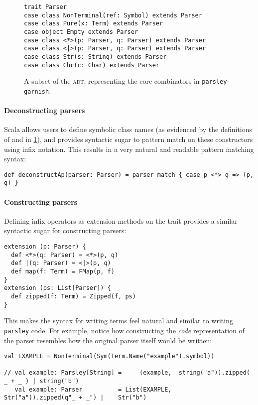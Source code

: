 \documentclass[../../main.tex]{subfiles}
\begin{document}
\begin{figure}[htbp]
\begin{verbatim}
trait Parser
case class NonTerminal(ref: Symbol) extends Parser
case class Pure(x: Term) extends Parser
case object Empty extends Parser
case class <*>(p: Parser, q: Parser) extends Parser
case class <|>(p: Parser, q: Parser) extends Parser
case class Str(s: String) extends Parser
case class Chr(c: Char) extends Parser
\end{verbatim}
\caption{A subset of the  \textsc{adt}, representing the core combinators in \texttt{parsley-garnish}.}
\label{fig:parser-adt}
\end{figure}

\paragraph{Deconstructing parsers}
Scala allows users to define symbolic class names (as evidenced by the definitions of \scala{<*>} and \scala{<|>} in \cref{fig:parser-adt}), and provides syntactic sugar to pattern match on these constructors using infix notation.
This results in a very natural and readable pattern matching syntax:
\begin{verbatim}
def deconstructAp(parser: Parser) = parser match { case p <*> q => (p, q) }
\end{verbatim}

\paragraph{Constructing parsers}
Defining infix operators as extension methods on the  trait provides a similar syntactic sugar for constructing parsers:
\begin{verbatim}
extension (p: Parser) {
  def <*>(q: Parser) = <*>(p, q)
  def |(q: Parser) = <|>(p, q)
  def map(f: Term) = FMap(p, f)
}
extension (ps: List[Parser]) {
  def zipped(f: Term) = Zipped(f, ps)
}
\end{verbatim}
%
This makes the syntax for writing  terms feel natural and similar to writing \texttt{parsley} code.
For example, notice how constructing the \emph{code} representation of the  parser resembles how the original parser itself would be written:
\begin{verbatim}
val EXAMPLE = NonTerminal(Sym(Term.Name("example").symbol))  

// val example: Parsley[String] =     (example,  string("a")).zipped(  _ + _ ) | string("b")
   val example: Parser          = List(EXAMPLE,     Str("a")).zipped(q"_ + _") |    Str("b")
\end{verbatim}
\end{document}

